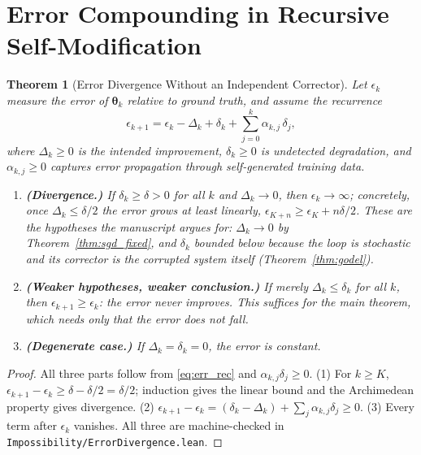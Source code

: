 \documentclass[11pt,a4paper]{article}
\newtheorem{theorem}{Theorem}[section]
\begin{document}
\section{Error Compounding in Recursive Self-Modification}

\begin{theorem}[Error Divergence Without an Independent Corrector]
\label{thm:error_compound}
Let $\epsilon_k$ measure the error of $\bm{\theta}_k$ relative to ground truth, and assume the recurrence
\begin{equation}
\epsilon_{k+1} = \epsilon_k - \Delta_k + \delta_k + \sum_{j=0}^{k} \alpha_{k,j}\, \delta_j ,
\label{eq:err_rec}
\end{equation}
where $\Delta_k \geq 0$ is the intended improvement, $\delta_k \geq 0$ is undetected degradation, and $\alpha_{k,j} \geq 0$ captures error propagation through self-generated training data.
\begin{enumerate}
    \item \textbf{(Divergence.)} If $\delta_k \geq \delta > 0$ for all $k$ and $\Delta_k \to 0$, then $\epsilon_k \to \infty$; concretely, once $\Delta_k \leq \delta/2$ the error grows at least linearly, $\epsilon_{K+n} \geq \epsilon_K + n\delta/2$. These are the hypotheses the manuscript argues for: $\Delta_k \to 0$ by Theorem~\ref{thm:sgd_fixed}, and $\delta_k$ bounded below because the loop is stochastic and its corrector is the corrupted system itself (Theorem~\ref{thm:godel}).
    \item \textbf{(Weaker hypotheses, weaker conclusion.)} If merely $\Delta_k \leq \delta_k$ for all $k$, then $\epsilon_{k+1} \geq \epsilon_k$: the error never improves. This suffices for the main theorem, which needs only that the error does not fall.
    \item \textbf{(Degenerate case.)} If $\Delta_k = \delta_k = 0$, the error is constant.
\end{enumerate}
\end{theorem}

\begin{proof}
All three parts follow from \eqref{eq:err_rec} and $\alpha_{k,j}\delta_j \geq 0$. (1) For $k \geq K$, $\epsilon_{k+1} - \epsilon_k \geq \delta - \delta/2 = \delta/2$; induction gives the linear bound and the Archimedean property gives divergence. (2) $\epsilon_{k+1} - \epsilon_k = (\delta_k - \Delta_k) + \sum_j \alpha_{k,j}\delta_j \geq 0$. (3) Every term after $\epsilon_k$ vanishes. All three are machine-checked in \texttt{Impossibility/ErrorDivergence.lean}.
\end{proof}
\end{document}
